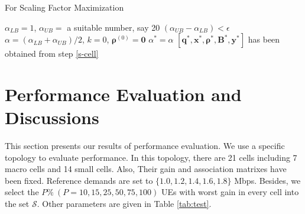 \documentclass[10pt,journal,final,finalsubmission,twocolumn]{IEEEtran}
\begin{document}
\begin{algorithm}[tbp]\label{al2}
\caption{For Scaling Factor Maximization} 
$\alpha_{LB}= 1$, $\alpha_{UB}= $ a suitable number, say 20\;
\Repeat 
{$(\alpha _{UB}- \alpha_{LB})<\epsilon$}
{$\alpha = (\alpha_{LB}+\alpha_{UB})/{2}$, $k=0$, $\boldsymbol{\rho}^{(0)}= \boldsymbol{0}$\;
}  
$\alpha^*= \alpha$\;
$[\boldsymbol{q}^*,\boldsymbol{x}^*,\boldsymbol{\rho}^*, \boldsymbol{B}^*,\boldsymbol{y}^*]$ has been obtained from step \ref{s-cell}\;
\;
\end{algorithm} 



\section{Performance Evaluation and Discussions}\label{Sec:PerformanceEvaluationDiscussions}

This section presents our results of performance evaluation. We use a specific topology to evaluate performance. In this topology, there are 21 cells including 7 macro cells and 14 small cells. Also, Their gain and association matrixes have been fixed. Reference demands are set to $\{1.0, 1.2, 1.4, 1.6, 1.8\}$ Mbps. Besides, we select the $P\%\ (P=10, 15, 25, 50, 75, 100)$ UEs with worst gain in every cell into the set $\mathcal{S}$. Other parameters are given in Table \ref{tab:test}.
\end{document}
